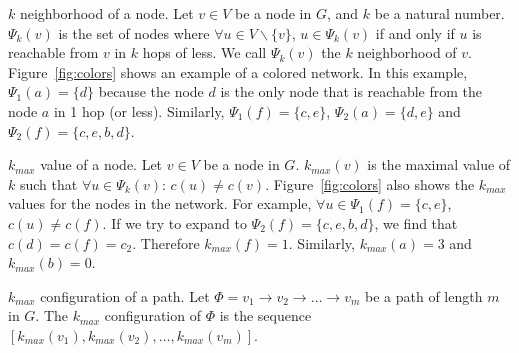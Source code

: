 \documentclass{ws-procs11x85}
\begin{document}
\begin{arabiclist}[3]
\item $k$ neighborhood of a node. Let $v \in V$ be a node in $G$, and
  $k$ be a natural number. $\Psi_k(v)$ is the set of nodes where
  $\forall u \in V \backslash \{v\}$, $u \in \Psi_k(v)$ if and only if
  $u$ is reachable from $v$ in $k$ hops of less. We call $\Psi_k(v)$
  the $k$ neighborhood of $v$. Figure~\ref{fig:colors} shows an
  example of a colored network. In this example, $\Psi_1(a) = \{d\}$
  because the node $d$ is the only node that is reachable from the
  node $a$ in 1 hop (or less). Similarly, $\Psi_1(f) = \{c, e\}$,
  $\Psi_2(a) = \{d, e\}$ and $\Psi_2(f) = \{c, e, b, d\}$.
\item $k_{max}$ value of a node. Let $v \in V$ be a node in $G$.
  $k_{max}(v)$ is the maximal value of $k$ such that $\forall u \in
  \Psi_k(v)$: $c(u) \neq c(v)$.  Figure~\ref{fig:colors} also shows
  the $k_{max}$ values for the nodes in the network. For example,
  $\forall u \in \Psi_1(f) = \{c, e\}$, $c(u) \neq c(f)$. If we try to
  expand to $\Psi_2(f) = \{c, e, b, d\}$, we find that $c(d) = c(f) =
  c_2$. Therefore $k_{max}(f) = 1$. Similarly, $k_{max}(a) = 3$ and
  $k_{max}(b) = 0$.
\item $k_{max}$
configuration of a path. Let $\Phi = v_1 \rightarrow v_2 \rightarrow \ldots \rightarrow v_m$ be a path of length $m$ in $G$. The
$k_{max}$ configuration of $\Phi$ is the sequence $[k_{max}(v_1),
k_{max}(v_2), \ldots , k_{max}(v_m)]$.
\end{arabiclist}
\end{document}
